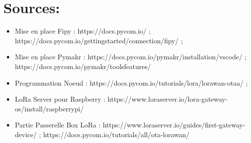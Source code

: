 \documentclass[letterpaper,10pt,french]{sphinxmanual}
\begin{document}
\section{Sources:}
\label{\detokenize{AnnexeA:sources}}\begin{itemize}
\item {} 
Mise en place Fipy : https://docs.pycom.io/ ; https://docs.pycom.io/gettingstarted/connection/fipy/ ;

\item {} 
Mise en place Pymakr : https://docs.pycom.io/pymakr/installation/vscode/ ; https://docs.pycom.io/pymakr/toolsfeatures/

\item {} 
Programmation Noeud : https://docs.pycom.io/tutorials/lora/lorawan-otaa/ ;

\item {} 
LoRa Server pour Raspberry : https://www.loraserver.io/lora-gateway-os/install/raspberrypi/

\item {} 
Partie Passerelle Box LoRa : https://www.loraserver.io/guides/first-gateway-device/ ; https://docs.pycom.io/tutorials/all/ota-lorawan/

\end{itemize}



\renewcommand{\indexname}{Index}
\printindex
\end{document}
